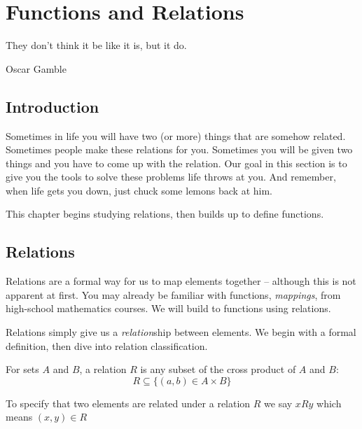 \documentclass[main.tex]{subfiles}
\begin{document}
\chapter{Functions and Relations}

\epigraph{They don't think it be like it is, but it do.}{Oscar Gamble}

\minitoc

\section{Introduction}

Sometimes in life you will have two (or more) things that are somehow related. Sometimes people make these relations for you. Sometimes you will be given two things and you have to come up with the relation. Our goal in this section is to give you the tools to solve these problems life throws at you. And remember, when life gets you down, just chuck some lemons back at him.

This chapter begins studying relations, then builds up to define functions.

\section{Relations}


Relations are a formal way for us to map elements together -- although this is not apparent at first. You may already be familiar with functions, \textit{mappings}, from high-school mathematics courses. We will build to functions using relations.

Relations simply give us a \textit{relation}ship between elements. We begin with a formal definition, then dive into relation classification.

\begin{defn}
	For sets \(A\) and \(B\), a relation \(R\) is any subset of the cross product of \(A\) and \(B\): \[R \subseteq \{(a,b) \in A \times B\}\]
	
	To specify that two elements are related under a relation \(R\) we say \(xRy\) which means \((x,y) \in R\)
\end{defn}
\end{document}
